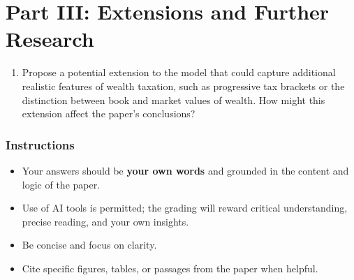 \documentclass[12pt]{article}
\begin{document}
\section*{Part III: Extensions and Further Research}

\begin{enumerate}
    \item Propose a potential extension to the model that could capture additional realistic features of wealth taxation, such as progressive tax brackets or the distinction between book and market values of wealth. How might this extension affect the paper’s conclusions?
\end{enumerate}

\subsubsection*{Instructions}

\begin{itemize}
    \item Your answers should be \textbf{your own words} and grounded in the content and logic of the paper.
    \item Use of AI tools is permitted; the grading will reward critical understanding, precise reading, and your own insights.
    \item Be concise and focus on clarity.
    \item Cite specific figures, tables, or passages from the paper when helpful.
\end{itemize}
\end{document}
